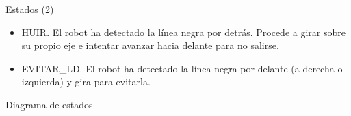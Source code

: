 \documentclass[spanish]{beamer}
\begin{document}
\begin{frame}{Estados (2)}
  \begin{itemize}
    \item HUIR. El robot ha detectado la línea negra por detrás. Procede a girar sobre su propio eje e intentar avanzar hacia delante para no salirse.
    \item EVITAR\_LD. El robot ha detectado la línea negra por delante (a derecha o izquierda) y gira para evitarla.
  \end{itemize}
\end{frame}

\begin{frame}[fragile]{Diagrama de estados}
\end{frame}
\end{document}
